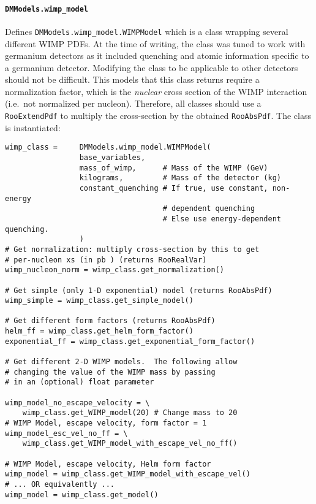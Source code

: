 			\paragraph{\lstinline!DMModels.wimp_model!}	
Defines \lstinline!DMModels.wimp_model.WIMPModel! which is a class wrapping several different WIMP PDFs.  At the time
of writing, the class was tuned to work with germanium detectors as it included quenching and atomic information
specific to a germanium detector.  Modifying the class to be applicable to other detectors should not be difficult.  
This models that this class returns require a normalization factor, which is the \emph{nuclear}
cross section of the WIMP interaction (i.e.~not normalized per nucleon).  
Therefore, all classes should use a \lstinline!RooExtendPdf! to multiply the cross-section by the obtained \lstinline!RooAbsPdf!.  
The class is instantiated:
				\begin{lstlisting}			
wimp_class =     DMModels.wimp_model.WIMPModel(
                 base_variables, 
                 mass_of_wimp,      # Mass of the WIMP (GeV) 
                 kilograms,         # Mass of the detector (kg)
                 constant_quenching # If true, use constant, non-energy 
                                    # dependent quenching
                                    # Else use energy-dependent quenching.
                 )
# Get normalization: multiply cross-section by this to get 
# per-nucleon xs (in pb ) (returns RooRealVar)
wimp_nucleon_norm = wimp_class.get_normalization() 

# Get simple (only 1-D exponential) model (returns RooAbsPdf)
wimp_simple = wimp_class.get_simple_model()        

# Get different form factors (returns RooAbsPdf)
helm_ff = wimp_class.get_helm_form_factor()
exponential_ff = wimp_class.get_exponential_form_factor()

# Get different 2-D WIMP models.  The following allow
# changing the value of the WIMP mass by passing
# in an (optional) float parameter

wimp_model_no_escape_velocity = \
    wimp_class.get_WIMP_model(20) # Change mass to 20
# WIMP Model, escape velocity, form factor = 1
wimp_model_esc_vel_no_ff = \
    wimp_class.get_WIMP_model_with_escape_vel_no_ff()

# WIMP Model, escape velocity, Helm form factor
wimp_model = wimp_class.get_WIMP_model_with_escape_vel()
# ... OR equivalently ... 
wimp_model = wimp_class.get_model()

				\end{lstlisting}				


